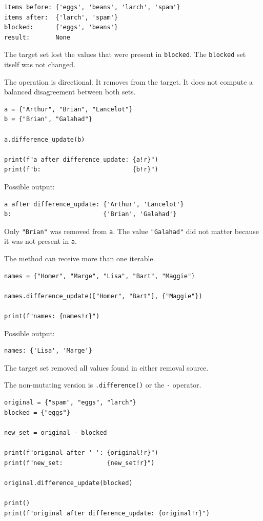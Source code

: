 \begin{verbatim}
items before: {'eggs', 'beans', 'larch', 'spam'}
items after:  {'larch', 'spam'}
blocked:      {'eggs', 'beans'}
result:       None
\end{verbatim}

The target set lost the values that were present in \texttt{blocked}. The \texttt{blocked} set itself was not changed.

The operation is directional. It removes from the target. It does not compute a balanced disagreement between both sets.

\begin{verbatim}
a = {"Arthur", "Brian", "Lancelot"}
b = {"Brian", "Galahad"}

a.difference_update(b)

print(f"a after difference_update: {a!r}")
print(f"b:                         {b!r}")
\end{verbatim}

Possible output:

\begin{verbatim}
a after difference_update: {'Arthur', 'Lancelot'}
b:                         {'Brian', 'Galahad'}
\end{verbatim}

Only \texttt{"Brian"} was removed from \texttt{a}. The value \texttt{"Galahad"} did not matter because it was not present in \texttt{a}.

The method can receive more than one iterable.

\begin{verbatim}
names = {"Homer", "Marge", "Lisa", "Bart", "Maggie"}

names.difference_update(["Homer", "Bart"], {"Maggie"})

print(f"names: {names!r}")
\end{verbatim}

Possible output:

\begin{verbatim}
names: {'Lisa', 'Marge'}
\end{verbatim}

The target set removed all values found in either removal source.

The non-mutating version is \texttt{.difference()} or the \texttt{-} operator.

\begin{verbatim}
original = {"spam", "eggs", "larch"}
blocked = {"eggs"}

new_set = original - blocked

print(f"original after '-': {original!r}")
print(f"new_set:            {new_set!r}")

original.difference_update(blocked)

print()
print(f"original after difference_update: {original!r}")
\end{verbatim}

